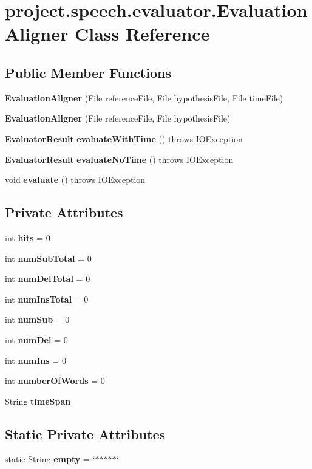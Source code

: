 \section{project.\+speech.\+evaluator.\+Evaluation\+Aligner Class Reference}
\label{classproject_1_1speech_1_1evaluator_1_1_evaluation_aligner}
\subsection*{Public Member Functions}
\begin{DoxyCompactItemize}
\item 
{\bf Evaluation\+Aligner} (File reference\+File, File hypothesis\+File, File time\+File)
\item 
{\bf Evaluation\+Aligner} (File reference\+File, File hypothesis\+File)
\item 
{\bf Evaluator\+Result} {\bf evaluate\+With\+Time} ()  throws I\+O\+Exception 
\item 
{\bf Evaluator\+Result} {\bf evaluate\+No\+Time} ()  throws I\+O\+Exception 
\item 
void {\bf evaluate} ()  throws I\+O\+Exception
\end{DoxyCompactItemize}
\subsection*{Private Attributes}
\begin{DoxyCompactItemize}
\item 
int {\bf hits} = 0
\item 
int {\bf num\+Sub\+Total} = 0
\item 
int {\bf num\+Del\+Total} = 0
\item 
int {\bf num\+Ins\+Total} = 0
\item 
int {\bf num\+Sub} = 0
\item 
int {\bf num\+Del} = 0
\item 
int {\bf num\+Ins} = 0
\item 
int {\bf number\+Of\+Words} = 0
\item 
String {\bf time\+Span}
\end{DoxyCompactItemize}
\subsection*{Static Private Attributes}
\begin{DoxyCompactItemize}
\item 
static String {\bf empty} = \char`\"{}$\ast$$\ast$$\ast$$\ast$$\ast$\char`\"{}
\end{DoxyCompactItemize}


